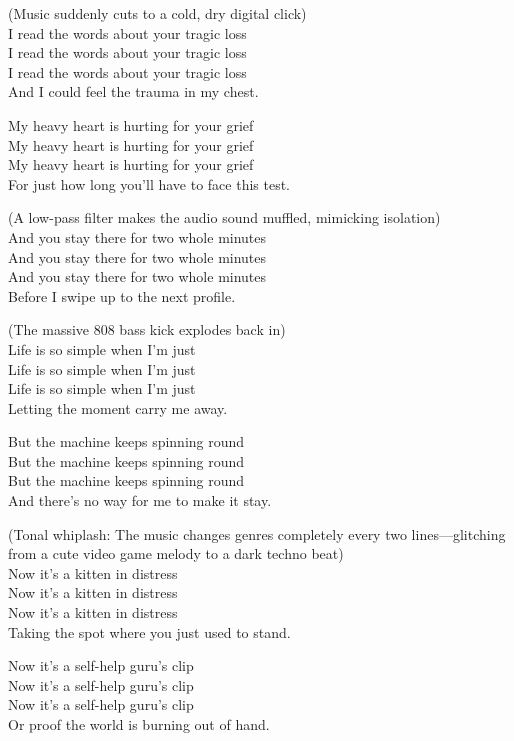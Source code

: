 \begin{lyrics}
(Music suddenly cuts to a cold, dry digital click)\\
I read the words about your tragic loss\\
I read the words about your tragic loss\\
I read the words about your tragic loss\\
And I could feel the trauma in my chest.

My heavy heart is hurting for your grief\\
My heavy heart is hurting for your grief\\
My heavy heart is hurting for your grief\\
For just how long you’ll have to face this test.

(A low-pass filter makes the audio sound muffled, mimicking isolation)\\
And you stay there for two whole minutes\\
And you stay there for two whole minutes\\
And you stay there for two whole minutes\\
Before I swipe up to the next profile.

(The massive 808 bass kick explodes back in)\\
Life is so simple when I’m just\\
Life is so simple when I’m just\\
Life is so simple when I’m just\\
Letting the moment carry me away.

But the machine keeps spinning round\\
But the machine keeps spinning round\\
But the machine keeps spinning round\\
And there’s no way for me to make it stay.

(Tonal whiplash: The music changes genres completely every two lines—glitching from a cute video game melody to a dark techno beat)\\
Now it’s a kitten in distress\\
Now it’s a kitten in distress\\
Now it’s a kitten in distress\\
Taking the spot where you just used to stand.

Now it's a self-help guru's clip\\
Now it's a self-help guru's clip\\
Now it's a self-help guru's clip\\
Or proof the world is burning out of hand.


\end{lyrics}

